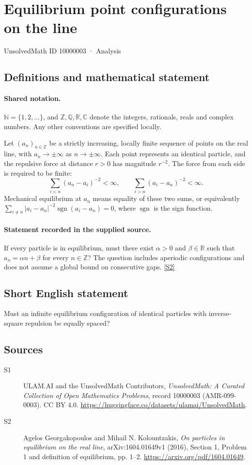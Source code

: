 \documentclass[11pt]{article}
\newcommand{\sref}[2]{\hyperlink{source:#1:#2}{[S#2]}}
\begin{document}
\setcounter{section}{10000002}
\section{Equilibrium point configurations on the line}\label{10000003}
{\small\sffamily UnsolvedMath ID 10000003 · Analysis}
\subsection{Definitions and mathematical statement}

\paragraph{Shared notation.}$\mathbb N=\{1,2,\ldots\}$, and $\mathbb Z,\mathbb Q,\mathbb R,\mathbb C$ denote the integers, rationals, reals and complex numbers. Any other conventions are specified locally.


Let $(a_n)_{n\in\mathbb Z}$ be a strictly increasing, locally finite sequence of points on the real line, with $a_n\to\pm\infty$ as $n\to\pm\infty$. Each point represents an identical particle, and the repulsive force at distance $r>0$ has magnitude $r^{-2}$. The force from each side is required to be finite:
\[\sum_{i<n}(a_n-a_i)^{-2}<\infty,\qquad \sum_{i>n}(a_i-a_n)^{-2}<\infty.\]
Mechanical equilibrium at $a_n$ means equality of these two sums, or equivalently $\sum_{i\ne n}|a_i-a_n|^{-2}\operatorname{sgn}(a_i-a_n)=0$, where $\operatorname{sgn}$ is the sign function.
\paragraph{Statement recorded in the supplied source.}
If every particle is in equilibrium, must there exist $\alpha>0$ and $\beta\in\mathbb R$ such that $a_n=\alpha n+\beta$ for every $n\in\mathbb Z$? The question includes aperiodic configurations and does not assume a global bound on consecutive gaps. \sref{10000003}{2}
\subsection{Short English statement}
Must an infinite equilibrium configuration of identical particles with inverse-square repulsion be equally spaced?
\subsection{Sources}
\begin{description}
\item[\hypertarget{source:10000003:1}{S1}] ULAM.AI and the UnsolvedMath Contributors, \emph{UnsolvedMath: A Curated Collection of Open Mathematics Problems}, record 10000003 (AMR-099-0003). CC BY 4.0. \url{https://huggingface.co/datasets/ulamai/UnsolvedMath}.
\item[\hypertarget{source:10000003:2}{S2}] Agelos Georgakopoulos and Mihail N. Kolountzakis, \emph{On particles in equilibrium on the real line}, arXiv:1604.01649v1 (2016), Section 1, Problem 1 and definition of equilibrium, pp. 1--2. \url{https://arxiv.org/pdf/1604.01649}.
\end{description}
\label{end:10000003}
\end{document}

